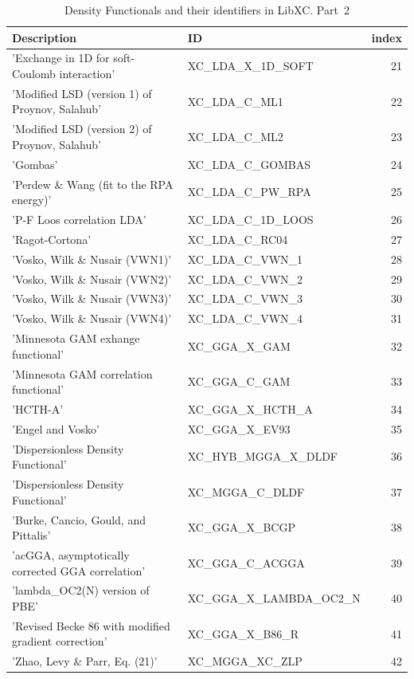 \documentclass[final,12pt,makeidx,DIV=calc]{article}
\begin{document}
{{{{{{\begin{table}[!h]
\caption{Density Functionals and their identifiers in LibXC. Part~2}
\begin{center}
\begin{tabular}{llr}
\hline
\hline
Description & ID & index\\
\hline
  'Exchange in 1D for soft-Coulomb interaction' & XC\_LDA\_X\_1D\_SOFT  &21\\
  'Modified LSD (version 1) of Proynov, Salahub' & XC\_LDA\_C\_ML1  & 22\\
  'Modified LSD (version 2) of Proynov, Salahub' & XC\_LDA\_C\_ML2  & 23\\
  'Gombas' & XC\_LDA\_C\_GOMBAS  & 24\\
  'Perdew \& Wang (fit to the RPA energy)' & XC\_LDA\_C\_PW\_RPA  & 25\\
  'P-F Loos correlation LDA' & XC\_LDA\_C\_1D\_LOOS  & 26\\
  'Ragot-Cortona' & XC\_LDA\_C\_RC04  & 27\\
  'Vosko, Wilk \& Nusair (VWN1)' & XC\_LDA\_C\_VWN\_1  & 28\\
  'Vosko, Wilk \& Nusair (VWN2)' & XC\_LDA\_C\_VWN\_2  & 29\\
  'Vosko, Wilk \& Nusair (VWN3)' & XC\_LDA\_C\_VWN\_3  & 30\\
  'Vosko, Wilk \& Nusair (VWN4)' & XC\_LDA\_C\_VWN\_4  & 31\\
  'Minnesota GAM exhange functional' & XC\_GGA\_X\_GAM  & 32\\
  'Minnesota GAM correlation functional' & XC\_GGA\_C\_GAM  & 33\\
  'HCTH-A' & XC\_GGA\_X\_HCTH\_A  & 34\\
  'Engel and Vosko' & XC\_GGA\_X\_EV93  & 35\\
  'Dispersionless Density Functional' & XC\_HYB\_MGGA\_X\_DLDF  & 36\\
  'Dispersionless Density Functional' & XC\_MGGA\_C\_DLDF  & 37\\
  'Burke, Cancio, Gould, and Pittalis' & XC\_GGA\_X\_BCGP  & 38\\
  'acGGA, asymptotically corrected GGA correlation' & XC\_GGA\_C\_ACGGA  & 39\\
  'lambda\_OC2(N) version of PBE' & XC\_GGA\_X\_LAMBDA\_OC2\_N  & 40\\
  'Revised Becke 86 with modified gradient correction' & XC\_GGA\_X\_B86\_R  & 41\\
  'Zhao, Levy \& Parr, Eq. (21)' & XC\_MGGA\_XC\_ZLP  & 42\\

\end{tabular}
\end{center}
\end{table}}}}}}}
\end{document}
